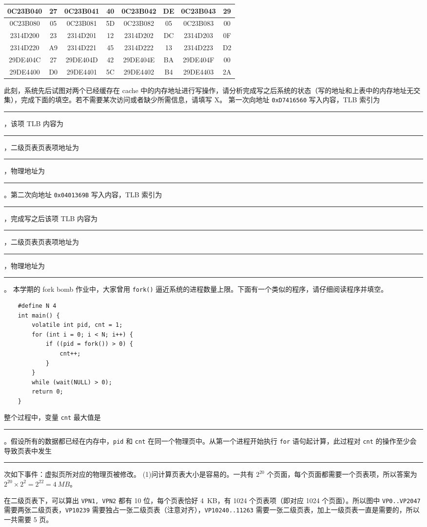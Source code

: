 \begin{problems}
\begin{table}[H]
\begin{tabular}{|c|c|c|c|c|c|c|c|}
                0C23B040 & 27 & 0C23B041 & 40 & 0C23B042 & DE & 0C23B043 & 29 \\ \hline
                0C23B080 & 05 & 0C23B081 & 5D & 0C23B082 & 05 & 0C23B083 & 00 \\ \hline
                2314D200 & 23 & 2314D201 & 12 & 2314D202 & DC & 2314D203 & 0F \\ \hline
                2314D220 & A9 & 2314D221 & 45 & 2314D222 & 13 & 2314D223 & D2 \\ \hline
                29DE404C & 27 & 29DE404D & 42 & 29DE404E & BA & 29DE404F & 00 \\ \hline
                29DE4400 & D0 & 29DE4401 & 5C & 29DE4402 & B4 & 29DE4403 & 2A \\ \hline
            \end{tabular}
        \end{table}
        此刻，系统先后试图对两个已经缓存在 cache 中的内存地址进行写操作，请分析完成写之后系统的状态（写的地址和上表中的内存地址无交集），完成下面的填空。若不需要某次访问或者缺少所需信息，请填写 X。
        第一次向地址 \verb|0xD7416560| 写入内容，TLB 索引为 \rule{2.5cm}{0.25mm}，该项 TLB 内容为 \rule{2.5cm}{0.25mm}，二级页表页表项地址为 \rule{2.5cm}{0.25mm}，物理地址为 \rule{2.5cm}{0.25mm}。第二次向地址 \verb|0x0401369B| 写入内容，TLB 索引为 \rule{2.5cm}{0.25mm}，完成写之后该项 TLB 内容为 \rule{2.5cm}{0.25mm}，二级页表页表项地址为 \rule{2.5cm}{0.25mm}，物理地址为 \rule{2.5cm}{0.25mm}。
        \qn 本学期的 fork bomb 作业中，大家曾用 \verb|fork()| 逼近系统的进程数量上限。下面有一个类似的程序，请仔细阅读程序并填空。
        \begin{verbatim}
    #define N 4
    int main() {
        volatile int pid, cnt = 1;
        for (int i = 0; i < N; i++) {
            if ((pid = fork()) > 0) {
                cnt++;
            }
        }
        while (wait(NULL) > 0);
        return 0;
    }
        \end{verbatim}
        整个过程中，变量 \verb|cnt| 最大值是 \rule{2.5cm}{0.25mm}。假设所有的数据都已经在内存中，\verb|pid| 和 \verb|cnt| 在同一个物理页中。从第一个进程开始执行 \verb|for| 语句起计算，此过程对 \verb|cnt| 的操作至少会导致页表中发生 \rule{2.5cm}{0.25mm} 次如下事件：虚拟页所对应的物理页被修改。
        \sol (1)问计算页表大小是容易的。一共有 $2^{20}$ 个页面，每个页面都需要一个页表项，所以答案为 $2^{20} \times 2^2=2^{22} = \SI{4}{MB}$。
        
        在二级页表下，可以算出 \verb|VPN1, VPN2| 都有 10 位，每个页表恰好 \SI{4}{KB}，有 1024 个页表项（即对应 1024 个页面）。所以图中 \verb|VP0..VP2047| 需要两张二级页表，\verb|VP10239| 需要独占一张二级页表（注意对齐），\verb|VP10240..11263| 需要一张二级页表，加上一级页表一直是需要的，所以一共需要 5 页。


\end{problems}
